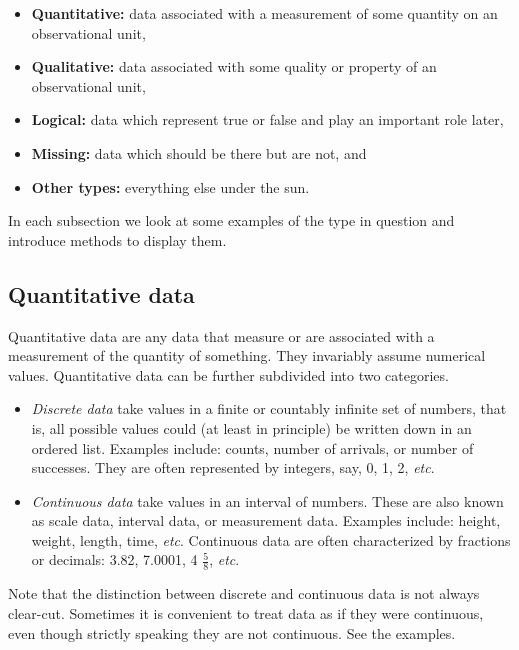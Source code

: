 \documentclass[]{book}
\providecommand{\tightlist}{%
  \setlength{\itemsep}{0pt}\setlength{\parskip}{0pt}}
\numberwithin{equation}{chapter}
\numberwithin{figure}{chapter}
\theoremstyle{plain}
\theoremstyle{definition}
\theoremstyle{remark}
\theoremstyle{definition}
\theoremstyle{definition}
\theoremstyle{remark}
\begin{document}
\begin{itemize}
\tightlist
\item
  \textbf{Quantitative:} data associated with a measurement of some
  quantity on an observational unit,
\item
  \textbf{Qualitative:} data associated with some quality or property of
  an observational unit,
\item
  \textbf{Logical:} data which represent true or false and play an
  important role later,
\item
  \textbf{Missing:} data which should be there but are not, and
\item
  \textbf{Other types:} everything else under the sun.
\end{itemize}

In each subsection we look at some examples of the type in question and
introduce methods to display them.

\subsection{Quantitative data}\label{sub-quantitative-data}

Quantitative data are any data that measure or are associated with a
measurement of the quantity of something. They invariably assume
numerical values. Quantitative data can be further subdivided into two
categories.

\begin{itemize}
\tightlist
\item
  \emph{Discrete data} take values in a finite or countably infinite set
  of numbers, that is, all possible values could (at least in principle)
  be written down in an ordered list. Examples include: counts, number
  of arrivals, or number of successes. They are often represented by
  integers, say, 0, 1, 2, \emph{etc}.
\item
  \emph{Continuous data} take values in an interval of numbers. These
  are also known as scale data, interval data, or measurement data.
  Examples include: height, weight, length, time, \emph{etc}. Continuous
  data are often characterized by fractions or decimals: 3.82, 7.0001, 4
  \(\frac{5}{8}\), \emph{etc}.
\end{itemize}

Note that the distinction between discrete and continuous data is not
always clear-cut. Sometimes it is convenient to treat data as if they
were continuous, even though strictly speaking they are not continuous.
See the examples.
\end{document}
